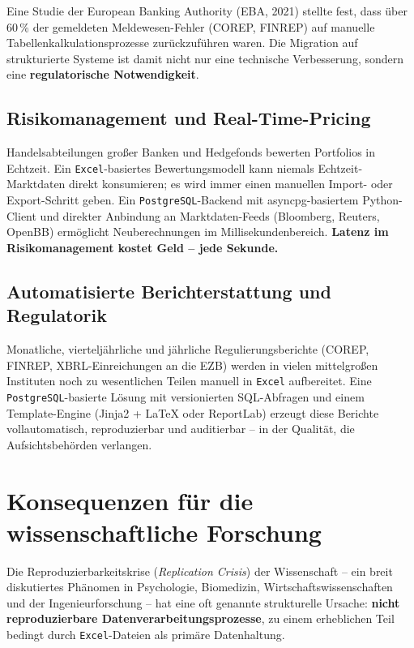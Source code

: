 ﻿\documentclass[12pt,a4paper]{report}
\theoremstyle{definition}
\theoremstyle{remark}
\newcommand{\excel}{\texttt{Excel}}
\newcommand{\pg}{\texttt{PostgreSQL}}
\begin{document}
Eine Studie der European Banking Authority (EBA, 2021)
stellte fest, dass über 60\,\% der gemeldeten Meldewesen-Fehler
(COREP, FINREP) auf manuelle Tabellenkalkulationsprozesse
zurückzuführen waren. Die Migration auf strukturierte Systeme
ist damit nicht nur eine technische Verbesserung, sondern eine
\textbf{regulatorische Notwendigkeit}.

\subsection{Risikomanagement und Real-Time-Pricing}

Handelsabteilungen großer Banken und Hedgefonds bewerten Portfolios
in Echtzeit. Ein \excel-basiertes Bewertungsmodell kann niemals
Echtzeit-Marktdaten direkt konsumieren; es wird immer einen manuellen
Import- oder Export-Schritt geben.
Ein \pg-Backend mit asyncpg-basiertem Python-Client und direkter
Anbindung an Marktdaten-Feeds (Bloomberg, Reuters, OpenBB) ermöglicht
Neuberechnungen im Millisekundenbereich.
\textbf{Latenz im Risikomanagement kostet Geld -- jede Sekunde.}

\subsection{Automatisierte Berichterstattung und Regulatorik}

Monatliche, vierteljährliche und jährliche Regulierungsberichte
(COREP, FINREP, XBRL-Einreichungen an die EZB) werden in vielen
mittelgroßen Instituten noch zu wesentlichen Teilen manuell in
\excel{} aufbereitet.
Eine \pg-basierte Lösung mit versionierten SQL-Abfragen und einem
Template-Engine (Jinja2 + \LaTeX{} oder ReportLab) erzeugt diese
Berichte vollautomatisch, reproduzierbar und auditierbar -- in der
Qualität, die Aufsichtsbehörden verlangen.

\section{Konsequenzen für die wissenschaftliche Forschung}

Die Reproduzierbarkeitskrise (\textit{Replication Crisis}) der
Wissenschaft -- ein breit diskutiertes Phänomen in Psychologie,
Biomedizin, Wirtschaftswissenschaften und der Ingenieurforschung --
hat eine oft genannte strukturelle Ursache: \textbf{nicht
reproduzierbare Datenverarbeitungsprozesse}, zu einem erheblichen
Teil bedingt durch \excel-Dateien als primäre Datenhaltung.
\end{document}
